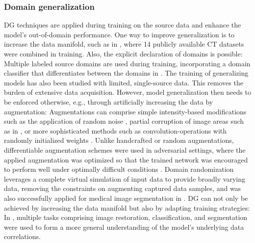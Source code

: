         \subsubsection{Domain generalization} %
        DG techniques are applied during training on the source data and enhance the model’s out-of-domain performance. One way to improve generalization is to increase the data manifold, such as in \cite{liu2023clip}, where 14 publicly available CT datasets were combined in training. Also, the explicit declaration of domains is possible: Multiple labeled source domains are used during training, incorporating a domain classifier that differentiates between the domains in  \cite{hu2022domain}.
        The training of generalizing models has also been studied with limited, single-source data. This removes the burden of extensive data acquisition. However, model generalization then needs to be enforced otherwise, e.g., through artificially increasing the data by augmentation:
        Augmentations can comprise simple intensity-based modifications such as the application of random noise \cite{zhou2022domain}, partial corruption of image areas such as in \cite{devries2017improved,he2022masked,hoyer2023mic},
        or more sophisticated methods such as convolution-operations with randomly initialized weights  \cite{xu2020robust,ouyang2022causality}.
        Unlike handcrafted or random augmentations, differentiable augmentation schemes were used in adversarial settings, where the applied augmentation was optimized so that the trained network was encouraged to perform well under optimally difficult conditions \cite{zhou2020deep, hu2022domain}.
        Domain randomization \cite{tobin2017domain} leverages a complete virtual simulation of input data to provide broadly varying data, removing the constraints on augmenting captured data samples, and was also successfully applied for medical image segmentation in \cite{billot2023synthseg}.
        DG can not only be achieved by increasing the data manifold but also by adapting training strategies: In \cite{bucci2021self, zhou2021models}, multiple tasks comprising image restoration, classification, and segmentation were used to form a more general understanding of the model’s underlying data correlations.

